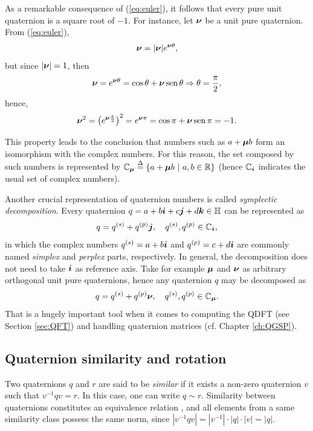 As a remarkable consequence of (\ref{eq:euler}), it follows that every pure unit quaternion is a square root of $-1$. For instance, let $ \boldsymbol{\nu} $ be a unit pure quaternion. From (\ref{eq:euler}),
\begin{equation}
\boldsymbol{\nu} = |\boldsymbol{\nu}| e^{\boldsymbol{\nu} \theta},
\end{equation}
but since $ |\boldsymbol{\nu}| = 1 $, then
\begin{equation}
\boldsymbol{\nu} = e^{\boldsymbol{\nu} \theta}  = \cos \theta + \boldsymbol{\nu} \mathrm{\, sen \,} \theta \Rightarrow \theta = \frac{\pi}{2},
\end{equation}
hence,
\begin{equation}
\boldsymbol{\nu}^2 = \left( e^{ \boldsymbol{\nu} \frac{\pi}{2}} \right)^2 = e^{\boldsymbol{\nu} \pi} = \cos \pi + \boldsymbol{\nu} \mathrm{\, sen \,} \pi = -1.
\end{equation}

This property leads to the conclusion that numbers such as $ a + \boldsymbol{\mu} b  $ form an isomorphism with the complex numbers. For this reason, the set composed by such numbers is represented by $ \mathbb{C}_{\boldsymbol{\mu}} \overset{\Delta}{=} \{ a + \boldsymbol{\mu} b \ |\  a, b \in \mathbb{R} \}$ (hence $ \mathbb{C}_{\boldsymbol{i}} $ indicates the usual set of complex numbers).

Another crucial representation of quaternion numbers is called \emph{symplectic decomposition}. Every quaternion $ q = a + b\boldsymbol{i} + c\boldsymbol{j} + d\boldsymbol{k} \in \mathbb{H} $ can be represented as
\begin{equation}
q = q^{(s)} + q^{(p)} \boldsymbol{j}, \quad q^{(s)}, q^{(p)} \in \mathbb{C}_{\boldsymbol{i}},
\end{equation}
in which the complex numbers $ q^{(s)} = a + b\boldsymbol{i} $ and $ q^{(p)} = c + d\boldsymbol{i} $ are commonly named \emph{simplex} and \emph{perplex} parts, respectively. In general, the decomposition does not need to take $\boldsymbol{i}$ as reference axis. Take for example $ \boldsymbol{\mu} $ and $ \boldsymbol{\nu} $ as arbitrary orthogonal unit pure quaternions, hence any quaternion $ q $ may be decomposed as
\begin{equation}
\label{eq:decomposicao}
q = q^{(s)} + q^{(p)} \boldsymbol{\nu}, \quad q^{(s)}, q^{(p)} \in \mathbb{C}_{\boldsymbol{\mu}}.
\end{equation}
That is a hugely important tool when it comes to computing the QDFT (see Section \ref{sec:QFT}) and handling quaternion matrices (cf. Chapter \ref{ch:QGSP}).

\subsection{Quaternion similarity and rotation}
\label{subsec:rotacionando}
Two quaternions $ q $ and $ r $ are said to be \emph{similar} if it exists a non-zero quaternion $ v $ such that $ v^{-1}q v = r $. In this case, one can write $ q \sim r $. Similarity between quaternions constitutes an equivalence relation \cite{zhang1997quaternions}, and all elements from a same similarity class possess the same norm, since $ |v^{-1}q v| = |v^{-1}| \cdot |q| \cdot |v| = |q| $.

